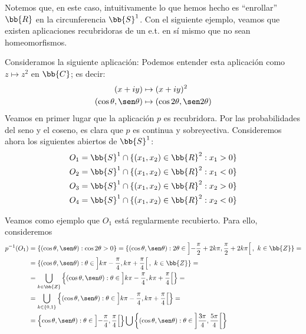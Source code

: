 Notemos que, en este caso, intuitivamente lo que hemos hecho es ``enrollar'' $\bb{R}$ en la circunferencia $\bb{S}^1$. Con el siguiente ejemplo, veamos que existen aplicaciones recubridoras de un e.t. en sí mismo que no sean homeomorfismos.
\begin{ejemplo}\label{ej:aplicacion_recubridora_no_homeomorfismo}
    Consideramos la siguiente aplicación:
    Podemos entender esta aplicación como $z\mapsto z^2$ en $\bb{C}$; es decir:
    \begin{align*}
        (x+iy) &\mapsto (x+iy)^2\\
        (\cos \theta, \sen \theta) &\mapsto (\cos 2\theta, \sen 2\theta)
    \end{align*}
    Veamos en primer lugar que la aplicación $p$ es recubridora. Por las probabilidades del seno y el coseno, es clara que $p$ es continua y sobreyectiva. Consideremos ahora los siguientes abiertos de $\bb{S}^1$:
    \begin{align*}
        O_1 &= \bb{S}^1\cap \{(x_1,x_2)\in \bb{R}^2 : x_1>0\}\\
        O_2 &= \bb{S}^1\cap \{(x_1,x_2)\in \bb{R}^2 : x_1<0\}\\
        O_3 &= \bb{S}^1\cap \{(x_1,x_2)\in \bb{R}^2 : x_2>0\}\\
        O_4 &= \bb{S}^1\cap \{(x_1,x_2)\in \bb{R}^2 : x_2<0\}
    \end{align*}

    Veamos como ejemplo que $O_1$ está regularmente recubierto. Para ello, consideremos
    \begin{align*}
        p^{-1}(O_1) &= \{(\cos \theta, \sen \theta) : \cos 2\theta > 0\} = \{(\cos \theta, \sen \theta) : 2\theta \in \left]-\frac{\pi}{2} + 2k\pi, \frac{\pi}{2} +2k\pi\right[,\ k\in \bb{Z}\} =\\
        &=\{(\cos \theta, \sen \theta) : \theta \in \left]k\pi-\frac{\pi}{4}, k\pi+\frac{\pi}{4}\right[,\ k\in \bb{Z}\} =\\&= \bigcup_{k\in \bb{Z}}\left\{(\cos \theta, \sen \theta) : \theta \in \left]k\pi-\frac{\pi}{4}, k\pi+\frac{\pi}{4}\right[\right\}
        =\\&= \bigcup_{k\in \{0,1\}}\left\{(\cos \theta, \sen \theta) : \theta \in \left]k\pi-\frac{\pi}{4}, k\pi+\frac{\pi}{4}\right[\right\}
        =\\&= \left\{\cos \theta, \sen \theta) : \theta \in \left]-\frac{\pi}{4}, \frac{\pi}{4}\right[\right\} \bigcup \left\{(\cos \theta, \sen \theta) : \theta \in \left]\frac{3\pi}{4}, \frac{5\pi}{4}\right[\right\}
    \end{align*}


\end{ejemplo}
